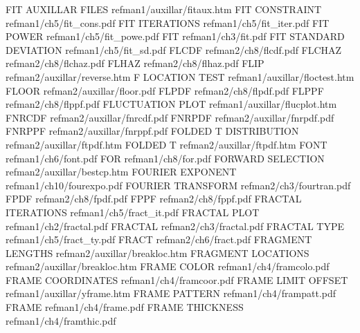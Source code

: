 FIT AUXILLAR FILES                      refman1/auxillar/fitaux.htm
FIT CONSTRAINT                          refman1/ch5/fit_cons.pdf
FIT ITERATIONS                          refman1/ch5/fit_iter.pdf
FIT POWER                               refman1/ch5/fit_powe.pdf
FIT                                     refman1/ch3/fit.pdf
FIT STANDARD DEVIATION                  refman1/ch5/fit_sd.pdf
FLCDF                                   refman2/ch8/flcdf.pdf
FLCHAZ                                  refman2/ch8/flchaz.pdf
FLHAZ                                   refman2/ch8/flhaz.pdf
FLIP                                    refman2/auxillar/reverse.htm
F LOCATION TEST                         refman1/auxillar/floctest.htm
FLOOR                                   refman2/auxillar/floor.pdf
FLPDF                                   refman2/ch8/flpdf.pdf
FLPPF                                   refman2/ch8/flppf.pdf
FLUCTUATION PLOT                        refman1/auxillar/flucplot.htm
FNRCDF                                  refman2/auxillar/fnrcdf.pdf
FNRPDF                                  refman2/auxillar/fnrpdf.pdf
FNRPPF                                  refman2/auxillar/fnrppf.pdf
FOLDED T DISTRIBUTION                   refman2/auxillar/ftpdf.htm
FOLDED T                                refman2/auxillar/ftpdf.htm
FONT                                    refman1/ch6/font.pdf
FOR                                     refman1/ch8/for.pdf
FORWARD SELECTION                       refman2/auxillar/bestcp.htm
FOURIER EXPONENT                        refman1/ch10/fourexpo.pdf
FOURIER TRANSFORM                       refman2/ch3/fourtran.pdf
FPDF                                    refman2/ch8/fpdf.pdf
FPPF                                    refman2/ch8/fppf.pdf
FRACTAL ITERATIONS                      refman1/ch5/fract_it.pdf
FRACTAL PLOT                            refman1/ch2/fractal.pdf
FRACTAL                                 refman2/ch3/fractal.pdf
FRACTAL TYPE                            refman1/ch5/fract_ty.pdf
FRACT                                   refman2/ch6/fract.pdf
FRAGMENT LENGTHS                        refman2/auxillar/breakloc.htm
FRAGMENT LOCATIONS                      refman2/auxillar/breakloc.htm
FRAME COLOR                             refman1/ch4/framcolo.pdf
FRAME COORDINATES                       refman1/ch4/framcoor.pdf
FRAME LIMIT OFFSET                      refman1/auxillar/yframe.htm
FRAME PATTERN                           refman1/ch4/frampatt.pdf
FRAME                                   refman1/ch4/frame.pdf
FRAME THICKNESS                         refman1/ch4/framthic.pdf
